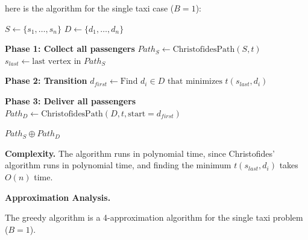 here is the algorithm for the single taxi case ($B=1$):
\begin{algorithm}
\caption{4-Approximation for Single Taxi ($B=1$)}
\begin{algorithmic}[1]
    \State $S \gets \{s_1, \ldots, s_n\}$
    \State $D \gets \{d_1, \ldots, d_n\}$

    \State \textbf{Phase 1: Collect all passengers}
    \State $Path_S \gets \text{ChristofidesPath}(S, t)$
    \State $s_{last} \gets \text{last vertex in } Path_S$

    \State \textbf{Phase 2: Transition}
    \State $d_{first} \gets \text{Find } d_i \in D \text{ that minimizes } t(s_{last}, d_i)$

    \State \textbf{Phase 3: Deliver all passengers}
    \State $Path_D \gets \text{ChristofidesPath}(D, t, \text{start}=d_{first})$

    \State \Return $Path_S \oplus Path_D$ 
\EndProcedure
\end{algorithmic}
\end{algorithm}


\textbf{Complexity.} The algorithm runs in polynomial time, since Christofides' algorithm runs in polynomial time, and finding the minimum $t(s_{last}, d_i)$ takes $O(n)$ time.


\textbf{Approximation Analysis.}

\begin{claim}
The greedy algorithm is a 4-approximation algorithm for the single taxi problem ($B=1$).
\end{claim}

